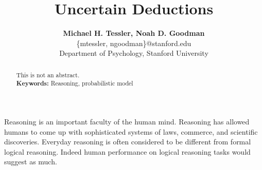 \documentclass[10pt,letterpaper]{article}
\begin{document}
\title{Uncertain Deductions}
 
\author{{\large \bf Michael H. Tessler, Noah D. Goodman } \\
	\{mtessler, ngoodman\}@stanford.edu \\
  Department of Psychology, Stanford University}

\maketitle


\begin{abstract}
This is not an abstract.\\
\textbf{Keywords:} 
Reasoning, probabilistic model
\end{abstract}

Reasoning is an important faculty of the human mind. Reasoning has allowed humans to come up with sophisticated systems of laws, commerce, and scientific discoveries. Everyday reasoning is often considered to be different from formal logical reasoning. Indeed human performance on logical reasoning tasks would suggest as much.
\end{document}
